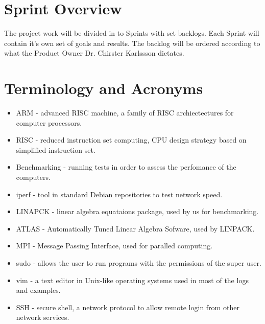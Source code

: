 \section{Sprint  Overview}


The project work will be divided in to Sprints with set backlogs. Each Sprint will contain it's own set of goals and results. The backlog will be ordered according to what the Product Owner Dr. Chirster Karlssson dictates. 

\section{Terminology and Acronyms}
\begin{itemize}
	\item ARM - advanced RISC machine, a family of RISC archiectectures for computer processors.
	\item RISC - reduced instruction set computing, CPU design strategy based on simplified instruction set.
	\item Benchmarking - running tests in order to assess the perfomance of the computers.
	\item iperf - tool in standard Debian repositories to test network speed.
	\item LINAPCK - linear algebra equataions package, used by us for benchmarking.
	\item ATLAS - Automatically Tuned Linear Algebra Sofware, used by LINPACK.
	\item MPI - Message Passing Interface, used for paralled computing.	
	\item sudo - allows the user to run programs with the permissions of the super user.
	\item vim - a text editor in Unix-like operating systems used in most of the logs and examples.
	\item SSH - secure shell, a network protocol to allow remote login from other network services.
\end{itemize}


